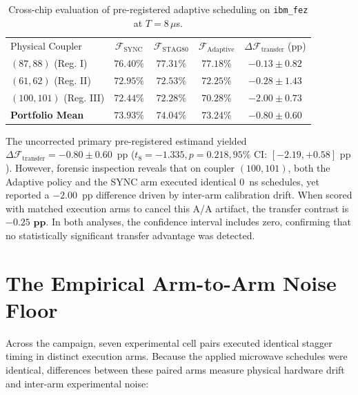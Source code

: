 \documentclass[aps,prl,twocolumn,amsmath,amssymb,superscriptaddress,floatfix]{revtex4-2}
\begin{document}
\begin{table}[h]
\caption{Cross-chip evaluation of pre-registered adaptive scheduling on \texttt{ibm\_fez} at $T = 8\,\mu$s.}
\label{tab:fez}
\begin{ruledtabular}
\begin{tabular}{lcccc}
Physical Coupler & $\mathcal{F}_{\text{SYNC}}$ & $\mathcal{F}_{\text{STAG80}}$ & $\mathcal{F}_{\text{Adaptive}}$ & $\Delta \mathcal{F}_{\text{transfer}}$ (pp) \\
\colrule
$(87, 88)$ (Reg. I) & $76.40\%$ & $77.31\%$ & $77.18\%$ & $-0.13 \pm 0.82$ \\
$(61, 62)$ (Reg. II) & $72.95\%$ & $72.53\%$ & $72.25\%$ & $-0.28 \pm 1.43$ \\
$(100, 101)$ (Reg. III) & $72.44\%$ & $72.28\%$ & $70.28\%$ & $-2.00 \pm 0.73$ \\
\colrule
\textbf{Portfolio Mean} & $\mathbf{73.93\%}$ & $\mathbf{74.04\%}$ & $\mathbf{73.24\%}$ & $\mathbf{-0.80 \pm 0.60}$ \\
\end{tabular}
\end{ruledtabular}
\end{table}

The uncorrected primary pre-registered estimand yielded $\Delta \mathcal{F}_{\text{transfer}} = -0.80 \pm 0.60$~pp ($t_8 = -1.335, p = 0.218, 95\%\text{ CI: } [-2.19, +0.58]\text{ pp}$). However, forensic inspection reveals that on coupler $(100, 101)$, both the Adaptive policy and the SYNC arm executed identical 0~ns schedules, yet reported a $-2.00$~pp difference driven by inter-arm calibration drift. When scored with matched execution arms to cancel this A/A artifact, the transfer contrast is $\mathbf{-0.25\text{ pp}}$. In both analyses, the confidence interval includes zero, confirming that no statistically significant transfer advantage was detected.

\section{The Empirical Arm-to-Arm Noise Floor}
Across the campaign, seven experimental cell pairs executed identical stagger timing in distinct execution arms. Because the applied microwave schedules were identical, differences between these paired arms measure physical hardware drift and inter-arm experimental noise:
\end{document}
